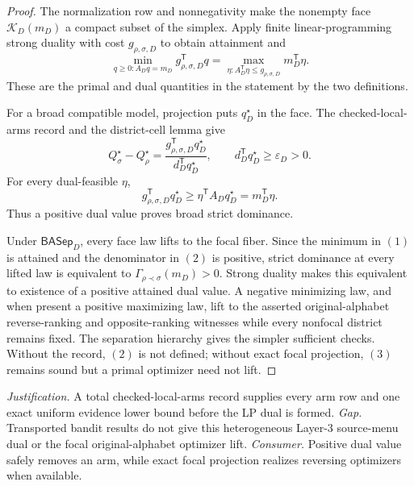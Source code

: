 \documentclass{article}
\begin{document}
\begin{proof}
The normalization row and nonnegativity make the nonempty face \(\mathcal K_D(m_D)\) a compact subset of the simplex.  Apply finite linear-programming strong duality with cost \(g_{\rho,\sigma,D}\) to obtain attainment and
\[
\min_{q\geq0:A_Dq=m_D}g_{\rho,\sigma,D}^{\mathsf T}q
=\max_{\eta:A_D^{\mathsf T}\eta\leq g_{\rho,\sigma,D}}
m_D^{\mathsf T}\eta.
\tag{1}
\]
These are the primal and dual quantities in the statement by the two definitions.

For a broad compatible model, projection puts \(q_D^\star\) in the face.  The checked-local-arms record and the district-cell lemma give
\[
Q_\sigma^\star-Q_\rho^\star
=\frac{g_{\rho,\sigma,D}^{\mathsf T}q_D^\star}
{d_D^{\mathsf T}q_D^\star},
\qquad
d_D^{\mathsf T}q_D^\star\geq\varepsilon_D>0.
\tag{2}
\]
For every dual-feasible \(\eta\),
\[
g_{\rho,\sigma,D}^{\mathsf T}q_D^\star
\geq\eta^{\mathsf T}A_Dq_D^\star
=m_D^{\mathsf T}\eta.
\tag{3}
\]
Thus a positive dual value proves broad strict dominance.

Under \(\mathsf{BASep}_D\), every face law lifts to the focal fiber.  Since the minimum in \((1)\) is attained and the denominator in \((2)\) is positive, strict dominance at every lifted law is equivalent to \(\Gamma_{\rho\prec\sigma}(m_D)>0\).  Strong duality makes this equivalent to existence of a positive attained dual value.  A negative minimizing law, and when present a positive maximizing law, lift to the asserted original-alphabet reverse-ranking and opposite-ranking witnesses while every nonfocal district remains fixed.  The separation hierarchy gives the simpler sufficient checks.  Without the record, \((2)\) is not defined; without exact focal projection, \((3)\) remains sound but a primal optimizer need not lift.
\end{proof}
\par\smallskip\noindent \textit{Justification.} A total checked-local-arms record supplies every arm row and one exact uniform evidence lower bound before the LP dual is formed. \textit{Gap.} Transported bandit results do not give this heterogeneous Layer-3 source-menu dual or the focal original-alphabet optimizer lift. \textit{Consumer.} Positive dual value safely removes an arm, while exact focal projection realizes reversing optimizers when available.
\end{document}
